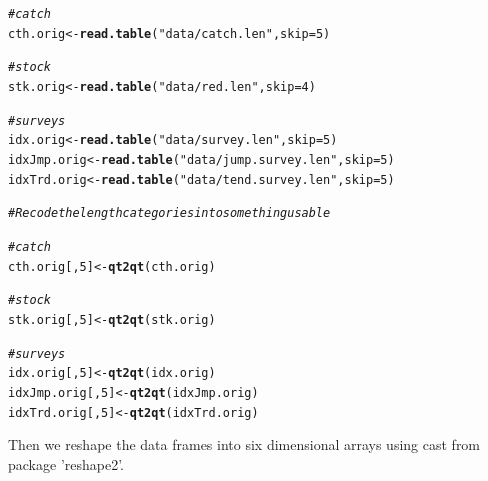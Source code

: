 \documentclass[a4paper,english,10pt]{article}\usepackage[]{graphicx}\usepackage[]{color}
\makeatletter
\newcommand{\hlnum}[1]{\textcolor[rgb]{0.686,0.059,0.569}{#1}}%
\newcommand{\hlstr}[1]{\textcolor[rgb]{0.192,0.494,0.8}{#1}}%
\newcommand{\hlcom}[1]{\textcolor[rgb]{0.678,0.584,0.686}{\textit{#1}}}%
\newcommand{\hlstd}[1]{\textcolor[rgb]{0.345,0.345,0.345}{#1}}%
\newcommand{\hlkwb}[1]{\textcolor[rgb]{0.69,0.353,0.396}{#1}}%
\newcommand{\hlkwc}[1]{\textcolor[rgb]{0.333,0.667,0.333}{#1}}%
\newcommand{\hlkwd}[1]{\textcolor[rgb]{0.737,0.353,0.396}{\textbf{#1}}}%
\newenvironment{kframe}{%
 \def\at@end@of@kframe{}%
 \ifinner\ifhmode%
  \def\at@end@of@kframe{\end{minipage}}%
  \begin{minipage}{\columnwidth}%
 \fi\fi%
 \def\FrameCommand##1{\hskip\@totalleftmargin \hskip-\fboxsep
 \colorbox{shadecolor}{##1}\hskip-\fboxsep
     \hskip-\linewidth \hskip-\@totalleftmargin \hskip\columnwidth}%
 \MakeFramed {\advance\hsize-\width
   \@totalleftmargin\z@ \linewidth\hsize
   \@setminipage}}%
 {\par\unskip\endMakeFramed%
 \at@end@of@kframe}
\newenvironment{knitrout}{}{} %
\makeatother
\begin{document}
\begin{knitrout}
\color{fgcolor}\begin{kframe}
\begin{alltt}
\hlcom{# catch}
\hlstd{cth.orig} \hlkwb{<-} \hlkwd{read.table}\hlstd{(}\hlstr{"data/catch.len"}\hlstd{,} \hlkwc{skip} \hlstd{=} \hlnum{5}\hlstd{)}

\hlcom{# stock}
\hlstd{stk.orig} \hlkwb{<-} \hlkwd{read.table}\hlstd{(}\hlstr{"data/red.len"}\hlstd{,} \hlkwc{skip} \hlstd{=} \hlnum{4}\hlstd{)}

\hlcom{# surveys}
\hlstd{idx.orig} \hlkwb{<-} \hlkwd{read.table}\hlstd{(}\hlstr{"data/survey.len"}\hlstd{,} \hlkwc{skip} \hlstd{=} \hlnum{5}\hlstd{)}
\hlstd{idxJmp.orig} \hlkwb{<-} \hlkwd{read.table}\hlstd{(}\hlstr{"data/jump.survey.len"}\hlstd{,} \hlkwc{skip} \hlstd{=} \hlnum{5}\hlstd{)}
\hlstd{idxTrd.orig} \hlkwb{<-} \hlkwd{read.table}\hlstd{(}\hlstr{"data/tend.survey.len"}\hlstd{,} \hlkwc{skip} \hlstd{=} \hlnum{5}\hlstd{)}

\hlcom{# Recode the length categories into something usable}

\hlcom{# catch}
\hlstd{cth.orig[,} \hlnum{5}\hlstd{]} \hlkwb{<-} \hlkwd{qt2qt}\hlstd{(cth.orig)}

\hlcom{# stock}
\hlstd{stk.orig[,} \hlnum{5}\hlstd{]} \hlkwb{<-} \hlkwd{qt2qt}\hlstd{(stk.orig)}

\hlcom{# surveys}
\hlstd{idx.orig[,} \hlnum{5}\hlstd{]} \hlkwb{<-} \hlkwd{qt2qt}\hlstd{(idx.orig)}
\hlstd{idxJmp.orig[,} \hlnum{5}\hlstd{]} \hlkwb{<-} \hlkwd{qt2qt}\hlstd{(idxJmp.orig)}
\hlstd{idxTrd.orig[,} \hlnum{5}\hlstd{]} \hlkwb{<-} \hlkwd{qt2qt}\hlstd{(idxTrd.orig)}
\end{alltt}
\end{kframe}
\end{knitrout}


Then we reshape the data frames into six dimensional arrays using cast from package 'reshape2'.
\end{document}
